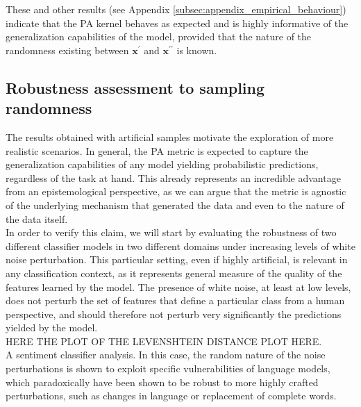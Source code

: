 These and other results (see Appendix \ref{subsec:appendix_empirical_behaviour}) indicate
that the PA kernel behaves as expected and is highly informative of the generalization
capabilities of the model, provided that the nature of the randomness existing
between $\bm{x}^\prime$ and $\bm{x}^{\prime \prime}$ is known.

\subsection{Robustness assessment to sampling randomness}

The results obtained with artificial samples motivate the exploration of more realistic
scenarios. In general, the PA metric is expected to capture the generalization capabilities
of any model yielding probabilistic predictions, regardless of the task at hand. This
already represents an incredible advantage from an epistemological perspective, as we
can argue that the metric is agnostic of the underlying mechanism that generated the data
and even to the nature of the data itself. \\

In order to verify this claim, we will start by evaluating the robustness of two
different classifier models in two different domains under increasing levels of 
white noise perturbation. This particular setting, even if highly artificial, is 
relevant in any classification context, as it represents general measure of the 
quality of the features learned by the model. The presence of white noise, at least 
at low levels, does not perturb the set of features that define a particular class from
a human perspective, and should therefore not perturb very significantly the
predictions yielded by the model. \\

HERE THE PLOT OF THE LEVENSHTEIN DISTANCE PLOT HERE. \\

A sentiment classifier analysis. In this case, the random nature of the noise perturbations
is shown to exploit specific vulnerabilities of language models, which paradoxically 
have been shown to be robust to more highly crafted perturbations, such as changes in
language or replacement of complete words. \\

